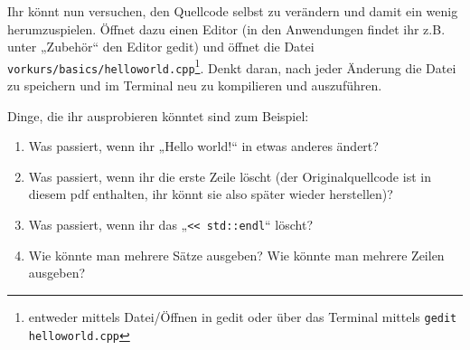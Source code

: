 
\begin{spiel}

    Ihr könnt nun versuchen, den Quellcode selbst zu verändern und damit ein wenig
    herumzuspielen. Öffnet dazu einen Editor (in den Anwendungen findet ihr z.B.
    unter „Zubehör“ den Editor gedit) und öffnet die Datei
    \texttt{vorkurs/basics/helloworld.cpp}\footnote{entweder mittels
        \glqq{}Datei/Öffnen\grqq{} in gedit oder über das Terminal mittels \texttt{gedit
            helloworld.cpp}}. Denkt daran, nach jeder Änderung die Datei zu speichern und
    im Terminal neu zu kompilieren und auszuführen.

    Dinge, die ihr ausprobieren könntet sind zum Beispiel:
    \begin{enumerate}
        \item Was passiert, wenn ihr „Hello world!“ in etwas anderes ändert?
        \item Was passiert, wenn ihr die erste Zeile löscht (der Originalquellcode
              ist in diesem pdf enthalten, ihr könnt sie also später wieder
              herstellen)?
        \item Was passiert, wenn ihr das „\verb|<< std::endl|“ löscht?
        \item Wie könnte man mehrere Sätze ausgeben? Wie könnte man mehrere Zeilen
              ausgeben?
    \end{enumerate}
\end{spiel}
